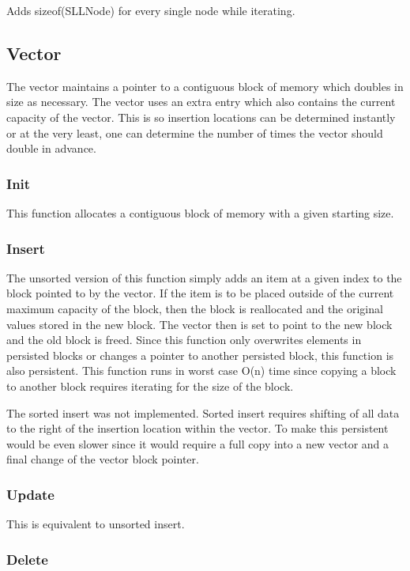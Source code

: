 \documentclass[twocolumn]{article}
\begin{document}
Adds sizeof(SLLNode) for every single node while iterating.

\subsection{Vector}

The vector maintains a pointer to a contiguous block of memory which doubles in
size as necessary. The vector uses an extra entry which also contains the
current capacity of the vector. This is so insertion locations can be determined
instantly or at the very least, one can determine the number of times the vector
should double in advance.

\subsubsection{Init}

This function allocates a contiguous block of memory with a given starting size.

\subsubsection{Insert}

The unsorted version of this function simply adds an item at a given index to
the block pointed to by the vector. If the item is to be placed outside of the
current maximum capacity of the block, then the block is reallocated and the
original values stored in the new block. The vector then is set to point to the
new block and the old block is freed. Since this function only overwrites
elements in persisted blocks or changes a pointer to another persisted block,
this function is also persistent. This function runs in worst case O(n) time
since copying a block to another block requires iterating for the size of the
block.

The sorted insert was not implemented. Sorted insert requires shifting of all
data to the right of the insertion location within the vector. To make this
persistent would be even slower since it would require a full copy into a new
vector and a final change of the vector block pointer.

\subsubsection{Update}

This is equivalent to unsorted insert.

\subsubsection{Delete}
\end{document}
